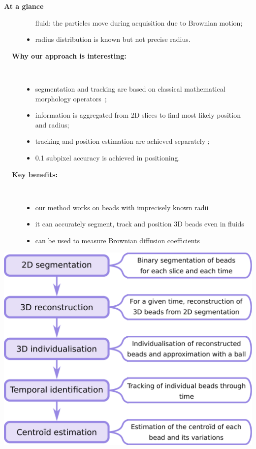 \documentclass[final,svgnames,dvipsnames,table]{beamer}
\begin{document}
\begin{frame}[fragile]
\begin{exampleblock}{\bf At a glance}
\begin{multicols}{2}
\begin{description}
\begin{itemize}
        fluid: the particles move during acquisition due to Brownian
        motion;
      \item radius distribution is known but not precise radius.
      \end{itemize} \bigskip %
    \item[{\bf ~~Why our approach is interesting:}] ~ %
      \begin{itemize}
      \item segmentation and tracking are based on classical mathematical morphology operators~{\color{cyan}\cite{morpho}};
      \item information is aggregated from 2D slices to find most likely
        position and radius;
      \item tracking and position estimation are achieved separately ;
      \item 0.1 subpixel accuracy is achieved in positioning.
      \end{itemize} \bigskip %
    \item[{\bf ~~Key benefits:} ] ~ %
      \begin{itemize}
      \item our method works on beads with imprecisely known radii
      \item it can accurately segment, track and position 3D beads even
        in fluids
      \item can be used to measure Brownian diffusion coefficients
      \end{itemize}
    \end{description}
    \includegraphics[width = 0.6\linewidth]{images/flowchart.pdf}
    \end{multicols}
   \end{exampleblock}
   
   
  \begin{columns}[t,totalwidth=\textwidth]


\end{columns}
\end{frame}
\end{document}
